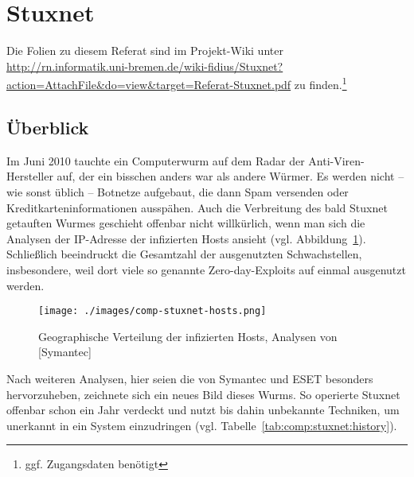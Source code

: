 \section{Stuxnet}
\label{compositions:stuxnet}

\authors{\DM}{}

Die Folien zu diesem Referat sind im Projekt-Wiki unter
\url{http://rn.informatik.uni-bremen.de/wiki-fidius/Stuxnet?action=AttachFile&do=view&target=Referat-Stuxnet.pdf}
zu finden.\footnote{ggf. Zugangsdaten benötigt}

\subsection{Überblick}

Im Juni 2010 tauchte ein Computerwurm auf dem Radar der
Anti-Viren-Hersteller auf, der ein bisschen anders war als andere
Würmer. Es werden nicht -- wie sonst üblich -- Botnetze aufgebaut, die
dann Spam versenden oder Kreditkarteninformationen ausspähen. Auch die
Verbreitung des bald Stuxnet getauften Wurmes geschieht offenbar nicht
willkürlich, wenn man sich die Analysen der IP-Adresse der infizierten
Hosts ansieht (vgl. Abbildung~\ref{fig:comp:stuxnet:hosts}).
Schließlich beeindruckt die Gesamtzahl der ausgenutzten
Schwachstellen, insbesondere, weil dort viele so genannte
Zero-day-Exploits auf einmal ausgenutzt werden.

\begin{figure}[hp]
  \centering
  \texttt{[image: ./images/comp-stuxnet-hosts.png]}
  \caption[Geographische Verteilung der infizierten Hosts]
    {Geographische Verteilung der infizierten Hosts, Analysen von [Symantec]}
  \label{fig:comp:stuxnet:hosts}
\end{figure}

Nach weiteren Analysen, hier seien die von Symantec und ESET besonders
hervorzuheben, zeichnete sich ein neues Bild dieses Wurms. So
operierte Stuxnet offenbar schon ein Jahr verdeckt und nutzt bis dahin
unbekannte Techniken, um unerkannt in ein System einzudringen (vgl.
Tabelle~\ref{tab:comp:stuxnet:history}).


